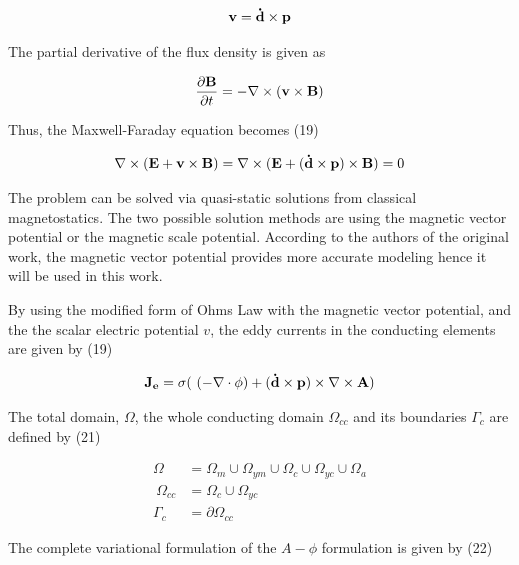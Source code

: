 \documentclass[lettersize,journal]{IEEEtran}
\begin{document}
\begin{equation}
\bold{v} = \bold{\dot{d}}\times \bold{p}
\end{equation}

The partial derivative of the flux density is given as

\begin{equation}
\frac{\partial \bold{B}}{\partial t} = -\nabla \times (\bold{v} \times \bold{B})
\end{equation}

Thus, the Maxwell-Faraday equation becomes (19)

\begin{equation}
\nabla \times (\bold{E} + \bold{v} \times \bold{B}) = \nabla \times (\bold{E} + (\bold{\dot{d}} \times \bold{p}) \times \bold{B} ) = 0
\end{equation}

The problem can be solved via quasi-static solutions from classical magnetostatics. The two possible solution methods are using the magnetic vector potential or the magnetic scale potential. According to the authors of the original work, the magnetic vector potential provides more accurate modeling hence it will be used in this work.

By using the modified form of Ohms Law with the magnetic vector potential, and the the scalar electric potential $v$, the eddy currents in the conducting elements are given by (19)

\begin{equation}
\bold{J_e} = \sigma(\ (-\nabla\cdot \phi) + (\bold{\dot{d}} \times \bold{p} )\times \nabla \times \bold{A})
\end{equation}


The total domain, $\Omega$, the whole conducting domain $\Omega_{cc}$ and its boundaries $\Gamma_c$ are defined by (21)

\begin{equation}
\begin{aligned}
\Omega\ \ &= \Omega_m \cup \Omega_{ym} \cup \Omega_c \cup \Omega_{yc} \cup \Omega_a\\ \ \Omega_{cc} &= \Omega_c \cup \Omega_{yc}\\ \Gamma_c\  &= \partial \Omega_{cc}
\end{aligned}
\end{equation}

The complete variational formulation of the $A-\phi$ formulation is given by (22)
\end{document}
